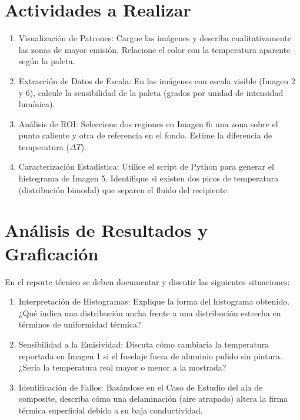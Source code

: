 \documentclass[11pt, a4paper]{article}
\begin{document}
\section{Actividades a Realizar}
\begin{enumerate}
    \item Visualización de Patrones: Cargue las imágenes y describa cualitativamente las zonas de mayor emisión. Relacione el color con la temperatura aparente según la paleta.
    \item Extracción de Datos de Escala: En las imágenes con escala visible (Imagen 2 y 6), calcule la sensibilidad de la paleta (grados por unidad de intensidad lumínica).
    \item Análisis de ROI: Seleccione dos regiones en Imagen 6: una zona sobre el punto caliente y otra de referencia en el fondo. Estime la diferencia de temperatura ($\Delta T$).
    \item Caracterización Estadística: Utilice el script de Python para generar el histograma de Imagen 5. Identifique si existen dos picos de temperatura (distribución bimodal) que separen el fluido del recipiente.
\end{enumerate}

\section{Análisis de Resultados y Graficación}
En el reporte técnico se deben documentar y discutir las siguientes situaciones:
\begin{enumerate}
    \item Interpretación de Histogramas: Explique la forma del histograma obtenido. ¿Qué indica una distribución ancha frente a una distribución estrecha en términos de uniformidad térmica?
    \item Sensibilidad a la Emisividad: Discuta cómo cambiaría la temperatura reportada en Imagen 1 si el fuselaje fuera de aluminio pulido sin pintura. ¿Sería la temperatura real mayor o menor a la mostrada?
    \item Identificación de Fallos: Basándose en el Caso de Estudio del ala de composite, describa cómo una delaminación (aire atrapado) altera la firma térmica superficial debido a su baja conductividad.
\end{enumerate}
\end{document}
